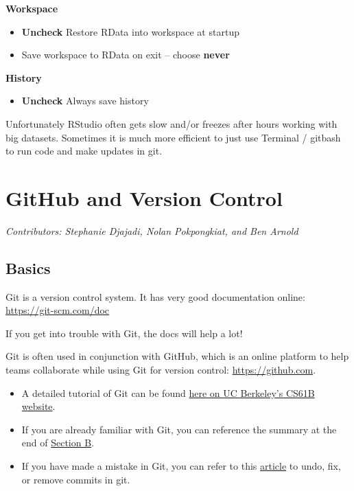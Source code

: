 \documentclass[
]{book}
\providecommand{\tightlist}{%
  \setlength{\itemsep}{0pt}\setlength{\parskip}{0pt}}
\begin{document}
\textbf{Workspace}

\begin{itemize}
\tightlist
\item
  \textbf{Uncheck} Restore RData into workspace at startup
\item
  Save workspace to RData on exit -- choose \textbf{never}
\end{itemize}

\textbf{History}

\begin{itemize}
\tightlist
\item
  \textbf{Uncheck} Always save history
\end{itemize}

Unfortunately RStudio often gets slow and/or freezes after hours working with big datasets. Sometimes it is much more efficient to just use Terminal / gitbash to run code and make updates in git.

\chapter{GitHub and Version Control}\label{github}

\emph{Contributors: Stephanie Djajadi, Nolan Pokpongkiat, and Ben Arnold}

\section{Basics}\label{basics-1}

Git is a version control system. It has very good documentation online: \url{https://git-scm.com/doc}

If you get into trouble with Git, the docs will help a lot!

Git is often used in conjunction with GitHub, which is an online platform to help teams collaborate while using Git for version control: \url{https://github.com}.

\begin{itemize}
\tightlist
\item
  A detailed tutorial of Git can be found \href{https://sp19.datastructur.es/materials/guides/using-git#b-local-repositories-narrative-introduction}{here on UC Berkeley's CS61B website}.
\item
  If you are already familiar with Git, you can reference the summary at the end of \href{https://sp19.datastructur.es/materials/guides/using-git#b-local-repositories-narrative-introduction}{Section B}.
\item
  If you have made a mistake in Git, you can refer to this \href{https://sethrobertson.github.io/GitFixUm/fixup.html}{article} to undo, fix, or remove commits in git.
\end{itemize}
\end{document}
